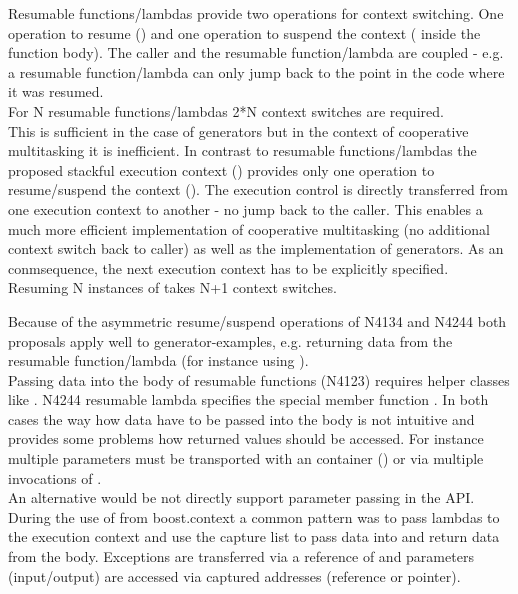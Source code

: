 Resumable functions/lambdas provide two operations for context switching. One
operation to resume (\rlop) and one operation to suspend the context (\yield
inside the function body). The caller and the resumable function/lambda are
coupled - e.g. a resumable function/lambda can only jump back to the point in
the code where it was resumed.\\
\newline
For N resumable functions/lambdas 2*N context switches are required.\\
This is sufficient in the case of generators but in the context of cooperative
multitasking it is inefficient.
In contrast to resumable functions/lambdas the proposed stackful execution
context (\ectx) provides only one operation to resume/suspend the context
(\ectxop). The execution control is directly transferred from one
execution context to another - no jump back to the caller. This enables a much
more efficient implementation of cooperative multitasking (no additional context
switch back to caller) as well as the implementation of generators. As an
conmsequence, the next execution context has to be explicitly specified.\\
\newline
Resuming N instances of \ectx takes N+1 context switches.

Because of the asymmetric resume/suspend operations of N4134 and N4244 both
proposals apply well to generator-examples, e.g. returning data from the
resumable function/lambda (for instance using \yield).\\
Passing data into the body of resumable functions (N4123) requires helper
classes like \channel.
N4244 resumable lambda specifies the special member function \rlwanted.
In both cases the way how data have to be passed into the body is not intuitive
and provides some problems how returned values should be accessed. For instance
multiple parameters must be transported with an container (\tuple) or via
multiple invocations of \rlwanted.\\
\newline
An alternative would be not directly support parameter passing in the API.\\
During the use of  from boost.context\cite{bcontext} a
common pattern was to pass lambdas to the execution context and use the capture
list to pass data into and return data from the body. Exceptions are transferred
via a reference of \excpt and parameters (input/output) are accessed via
captured addresses (reference or pointer).

